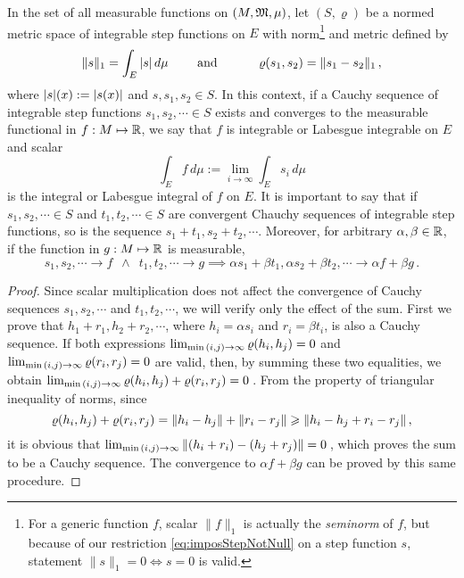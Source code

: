 In the set of all measurable functions on $(M,\mathfrak{M},\mu)$, let $(S,\varrho)$ be a normed metric space of integrable step functions on $E$ with norm\footnote{For a generic function $f$, scalar $\|f\|_1$ is actually the \emph{seminorm} of $f$, but because of our restriction \eqref{eq:imposStepNotNull} on a step function $s$, statement $\|s\|_1=0\iff s=0$ is valid.} and metric defined by
\begin{alignat*} {3}
\|s\|_1=\int_E |s|\,d\mu&\qquad \text{ and } \qquad&\varrho(s_1,s_2)=\|s_1-s_2\|_1\,,
\end{alignat*}
where $|s|(x):=|s(x)|$ and $s,s_1,s_2\in S$. In this context, if a Cauchy sequence of integrable step functions $s_1,s_2,\cdots\in S$ exists and converges to the measurable functional in $f : M \mapsto \mathbb{R}$, we say that $f$ is integrable or Labesgue integrable on $E$ and scalar
\begin{equation}\label{eq:integ}
\int_E f \,d\mu := \lim_{i\to \infty}\int_E s_i \,d\mu
\end{equation}
is the integral or Labesgue integral of $f$ on $E$. It is important to say that if $s_1,s_2,\cdots\in S$ and $t_1,t_2,\cdots\in S$ are convergent Chauchy sequences of integrable step functions, so is the sequence $ s_1+t_1, s_2+ t_2,\cdots$. Moreover, for arbitrary $\alpha,\beta\in\mathbb{R}$, if the function in $g : M \mapsto \mathbb{R}$ is measurable, 
\begin{equation}\label{eq:cauchySum}
s_1,s_2,\cdots\to f\,\,\, \wedge\,\,\, t_1,t_2,\cdots\to g \implies \alpha s_1+ \beta t_1, \alpha s_2+ \beta t_2,\cdots\to \alpha f+\beta g\,.
\end{equation}

{\footnotesize
\begin{proof}
Since scalar multiplication does not affect the convergence of Cauchy sequences $s_1,s_2,\cdots$ and $t_1,t_2,\cdots$, we will verify only the effect of the sum. First we prove that $  h_1+ r_1,h_2+ r_2,\cdots$, where $h_i=\alpha s_i$ and $r_i=\beta t_i$, is also a Cauchy sequence. If both expressions $\lim_{\min{\left (i,j\right )}\to\infty}{\varrho(h_i,h_j)}=0$ and $\lim_{\min{\left (i,j\right )}\to\infty}{\varrho(r_i,r_j)}=0$ are valid, then, by summing these two equalities, we obtain $\lim_{\min{\left (i,j\right )}\to\infty}\varrho(h_i,h_j)+\varrho(r_i,r_j)=0\,$. From the property of triangular inequality of norms, since
\begin{equation*}
\varrho(h_i,h_j)+\varrho(r_i,r_j) = \|h_i-h_j\| + \|r_i-r_j\| \geqslant \|h_i-h_j + r_i-r_j\|\,,
\end{equation*}
it is obvious that $\lim_{\min{\left (i,j\right )}\to\infty}\|(h_i+ r_i) -(h_j +r_j)\|=0\,$, which proves the sum to be a Cauchy sequence. The convergence to $\alpha f+\beta g$ can be  proved by this same procedure.
\end{proof}}

